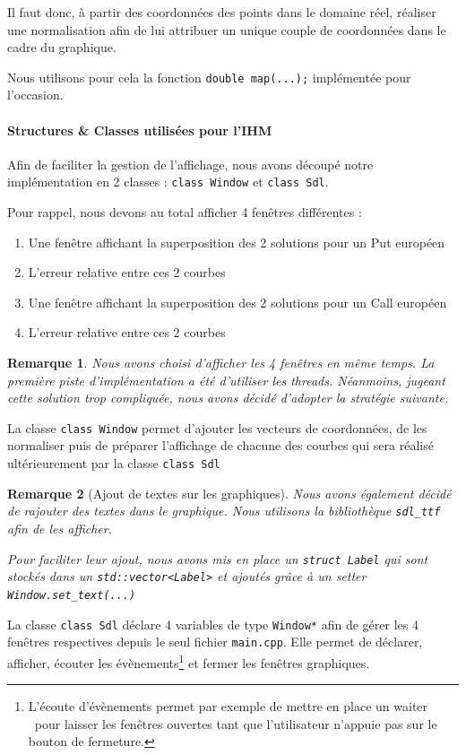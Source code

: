 \documentclass[11pt,a4paper]{article}
\theoremstyle{plain}
\newtheorem{rmq}{Remarque}
\begin{document}
Il faut donc, à partir des coordonnées des points dans le domaine réel, réaliser une normalisation afin de lui attribuer un unique couple de coordonnées dans le cadre du graphique.

Nous utilisons pour cela la fonction \texttt{double map(...);} implémentée pour l'occasion.

\paragraph{Structures \& Classes utilisées pour l'IHM}
Afin de faciliter la gestion de l'affichage, nous avons découpé notre implémentation en 2 classes : \texttt{class Window} et \texttt{class Sdl}.

Pour rappel, nous devons au total afficher 4 fenêtres différentes :
\begin{enumerate}
    \item Une fenêtre affichant la superposition des 2 solutions pour un Put européen
    \item L'erreur relative entre ces 2 courbes
    \item Une fenêtre affichant la superposition des 2 solutions pour un Call européen
    \item L'erreur relative entre ces 2 courbes
\end{enumerate}

\begin{rmq}
Nous avons choisi d'afficher les 4 fenêtres en même temps. La première piste d'implémentation a été d'utiliser les threads. Néanmoins, jugeant cette solution trop compliquée, nous avons décidé d'adopter la stratégie suivante.
\end{rmq}

La classe \texttt{class Window} permet d'ajouter les vecteurs de coordonnées, de les normaliser puis de préparer l'affichage de chacune des courbes qui sera réalisé ultérieurement par la classe \texttt{class Sdl}


\begin{rmq}[Ajout de textes sur les graphiques] 
Nous avons également décidé de rajouter des textes dans le graphique. Nous utilisons la bibliothèque \verb|sdl_ttf| afin de les afficher.

Pour faciliter leur ajout, nous avons mis en place un \texttt{struct Label} qui sont stockés dans un \texttt{std::vector<Label>} et ajoutés grâce à un setter \texttt{Window.set_text(...)}
\end{rmq}
La classe \texttt{class Sdl} déclare 4 variables de type \texttt{Window*} afin de gérer les 4 fenêtres respectives depuis le seul fichier \verb|main.cpp|.
Elle permet de déclarer, afficher, écouter les évènements\footnote{L'écoute d'évènements permet par exemple de mettre en place un \og waiter \fg \ pour laisser les fenêtres ouvertes tant que l'utilisateur n'appuie pas sur le bouton de fermeture.} et fermer les fenêtres graphiques.
\end{document}
